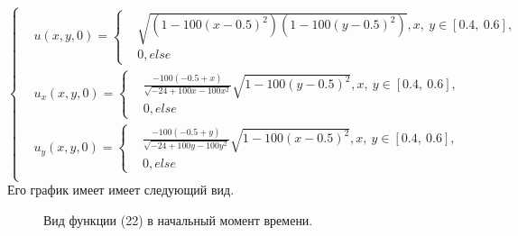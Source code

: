 \documentclass[14pt]{article}
\begin{document}
\begin{equation}
\left\lbrace
\begin{aligned}
&u(x,y,0) = \left\lbrace \begin{aligned}
&\sqrt{(1-100(x-0.5)^2)(1-100(y-0.5)^2)}, x,\:y \in [0.4,\:0.6],\\
&0, else
\end{aligned}
\right . \\
&u_x(x,y,0) = \left\lbrace \begin{aligned}
& \frac{-100(-0.5 + x)}{ \sqrt{-24 + 100x - 100x^2}}\sqrt{1-100(y-0.5)^2}, x,\:y \in [0.4,\:0.6],\\
&0, else
\end{aligned}
\right . \\
&u_y(x,y,0) =  \left\lbrace \begin{aligned}
&\frac{-100(-0.5 + y)}{ \sqrt{-24 + 100y - 100y^2}}\sqrt{1-100(x-0.5)^2}, x,\:y \in [0.4,\:0.6],\\
&0, else
\end{aligned}
\right . \\
\end{aligned}
\right .
\end{equation}
Его график имеет имеет следующий вид.
\begin{figure}[H]
\caption{Вид функции (22) в начальный момент времени.}
\end{figure}
\end{document}
